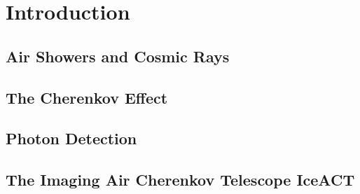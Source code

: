 \chapter{Introduction}

\section{Air Showers and Cosmic Rays}

\section{The Cherenkov Effect}

\section{Photon Detection}

\section{The Imaging Air Cherenkov Telescope IceACT}